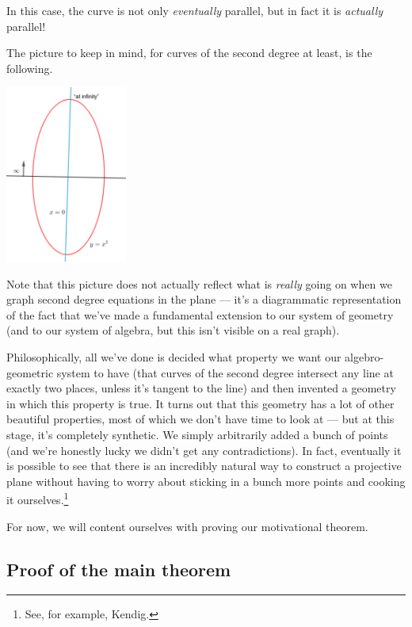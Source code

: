 \documentclass[a4paper,leqno,10pt]{article}
\theoremstyle{exercise}
\theoremstyle{plain}
\theoremstyle{definition}
\theoremstyle{remark}
\begin{document}
In this case, the curve is not only \emph{eventually} parallel, but in fact it is \emph{actually} parallel!

The picture to keep in mind, for curves of the second degree at least, is the following.

\begin{center}
  \includegraphics[width=0.3\textwidth]{infiniteparabola}
\end{center}

Note that this picture does not actually reflect what is \emph{really} going on when we graph second degree
equations in the plane --- it's a diagrammatic representation of the fact that we've made a fundamental extension
to our system of geometry (and to our system of algebra, but this isn't visible on a real graph).

Philosophically, all we've done is decided what property we want our algebro-geometric system to have (that
curves of the second degree intersect any line at exactly two places, unless it's tangent to the line) and then
invented a geometry in which this property is true. It turns out that this geometry has a lot of other beautiful
properties, most of which we don't have time to look at --- but at this stage, it's completely synthetic. We simply
arbitrarily added a bunch of points (and we're honestly lucky we didn't get any contradictions). In fact, eventually
it is possible to see that there is an incredibly natural way to construct a projective plane without having to worry about
sticking in a bunch more points and cooking it ourselves.\footnote{See, for example, Kendig.}

For now, we will content ourselves with proving our motivational theorem.

\subsection{Proof of the main theorem}
\end{document}
